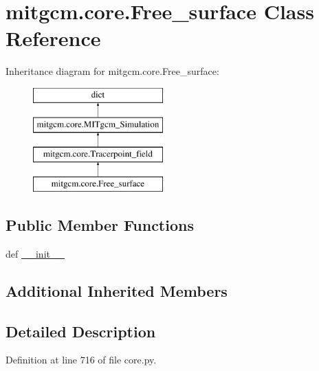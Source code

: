 \hypertarget{classmitgcm_1_1core_1_1Free__surface}{\section{mitgcm.\+core.\+Free\+\_\+surface Class Reference}
\label{classmitgcm_1_1core_1_1Free__surface}
}
Inheritance diagram for mitgcm.\+core.\+Free\+\_\+surface\+:\begin{figure}[H]
\begin{center}
\leavevmode
\includegraphics[height=4.000000cm]{classmitgcm_1_1core_1_1Free__surface}
\end{center}
\end{figure}
\subsection*{Public Member Functions}
\begin{DoxyCompactItemize}
\item 
def \hyperlink{classmitgcm_1_1core_1_1Free__surface_aae91ac10ad70025da71f3694f063ec8b}{\+\_\+\+\_\+init\+\_\+\+\_\+}
\end{DoxyCompactItemize}
\subsection*{Additional Inherited Members}


\subsection{Detailed Description}


Definition at line 716 of file core.\+py.



